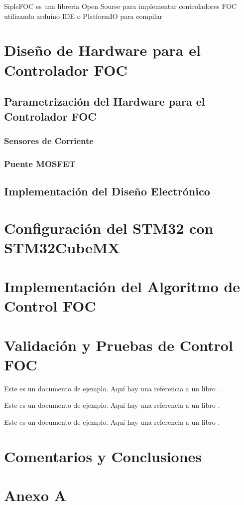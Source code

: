 \documentclass[11pt]{report}
\begin{document}
SipleFOC \cite{Skuric_SimpleFOC_A_Field_2022} es una libreria Open Sourse para implementar controladores FOC utilizando arduino IDE o PlatformIO para compilar

\newpage
\chapter{Diseño de Hardware para el Controlador FOC}
\section{Parametrización del Hardware para el Controlador FOC}
\subsection{Sensores de Corriente}
\subsection{Puente MOSFET}
\section{Implementación del Diseño Electrónico}

\newpage
\chapter{Configuración del STM32 con STM32CubeMX}

\newpage
\chapter{Implementación del Algoritmo de Control FOC}

\newpage
\chapter{Validación y Pruebas de Control FOC}
Este es un documento de ejemplo. Aquí hay una referencia a un libro \cite{power_conv_00}.

Este es un documento de ejemplo. Aquí hay una referencia a un libro \cite{AN2757_00}.

Este es un documento de ejemplo. Aquí hay una referencia a un libro \cite{odrive_SVM}.

\newpage
\chapter*{Comentarios y Conclusiones}

\newpage
{}
\printbibliography

\newpage
{}

\chapter*{Anexo A}
\end{document}

